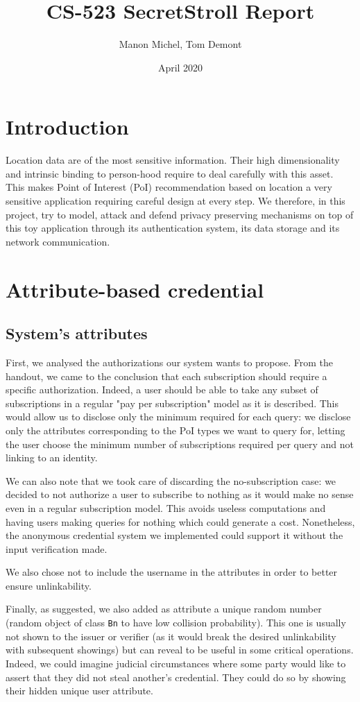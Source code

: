 \documentclass[10pt,conference,compsocconf]{IEEEtran}
\title{CS-523 SecretStroll Report}
\author{Manon Michel, Tom Demont}
\date{April 2020}
\begin{document}
\maketitle


\section{Introduction}
Location data are of the most sensitive information. Their high dimensionality and intrinsic binding to person-hood require to deal carefully with this asset. This makes Point of Interest (PoI) recommendation based on location a very sensitive application requiring careful design at every step. We therefore, in this project, try to model, attack and defend privacy preserving mechanisms on top of this toy application through its authentication system, its data storage and its network communication.

\section{Attribute-based credential}
\subsection{System's attributes}
First, we analysed the authorizations our system wants to propose. From the handout, we came to the conclusion that each subscription should require a specific authorization. Indeed, a user should be able to take any subset of subscriptions in a regular "pay per subscription" model as it is described. This would allow us to disclose only the minimum required for each query: we disclose only the attributes corresponding to the PoI types we want to query for, letting the user choose the minimum number of subscriptions required per query and not linking to an identity.

We can also note that we took care of discarding the no-subscription case: we decided to not authorize a user to subscribe to nothing as it would make no sense even in a regular subscription model. This avoids useless computations and having users making queries for nothing which could generate a cost. Nonetheless, the anonymous credential system we implemented could support it without the input verification made.

We also chose not to include the username in the attributes in order to better ensure unlinkability.

Finally, as suggested, we also added as attribute a unique random number (random object of class \texttt{Bn} to have low collision probability). This one is usually not shown to the issuer or verifier (as it would break the desired unlinkability with subsequent showings) but can reveal to be useful in some critical operations. Indeed, we could imagine judicial circumstances where some party would like to assert that they did not steal another's credential. They could do so by showing their hidden unique user attribute.
\end{document}
